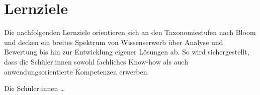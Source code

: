 \section*{Lernziele}

Die nachfolgenden Lernziele orientieren sich an den Taxonomiestufen nach Bloom und decken ein breites Spektrum von Wissenserwerb über Analyse und Bewertung bis hin zur Entwicklung eigener Lösungen ab. So wird sichergestellt, dass die Schüler:innen sowohl fachliches Know-how als auch anwendungsorientierte Kompetenzen erwerben.

Die Schüler:innen \ldots

\begin{itemize}
\end{itemize}